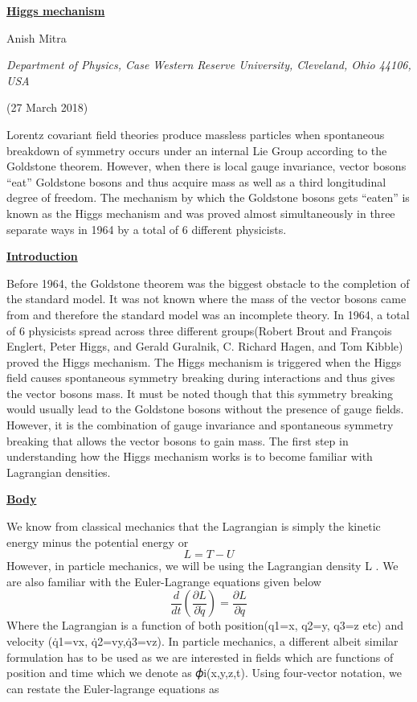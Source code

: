 \documentclass[12pt]{article}
\begin{document}
	\begin{center}
		\textbf{\underline{Higgs mechanism}}
		
		Anish Mitra
		
		\textit{Department of Physics, Case Western Reserve University, Cleveland, Ohio 44106, USA }
		
		(27 March 2018)
		
	\end{center}

\begin{changemargin}{1.5cm}{1.5cm} 	
Lorentz covariant field theories produce massless particles when spontaneous breakdown of symmetry occurs under an internal Lie Group according to the Goldstone theorem. However, when there is local gauge invariance, vector bosons “eat” Goldstone bosons and thus acquire mass as well as a third longitudinal degree of freedom. The mechanism by which the Goldstone bosons gets “eaten” is known as the Higgs mechanism and was proved almost simultaneously in three separate ways in 1964 by a total of 6 different physicists.
\end{changemargin}
\begin{flushleft}
\textbf{\underline{Introduction}}
\end{flushleft}
Before 1964, the Goldstone theorem was the biggest obstacle to the completion of the standard model. It was not known where the mass of the vector bosons came from and therefore the standard model was an incomplete theory. In 1964, a total of 6 physicists spread across three different groups(Robert Brout and François Englert, Peter Higgs, and Gerald Guralnik, C. Richard Hagen, and Tom Kibble) proved the Higgs mechanism. The Higgs mechanism is triggered when the Higgs field causes spontaneous symmetry breaking during interactions and thus gives the vector bosons mass. It  must be noted though that this symmetry breaking would usually lead to the Goldstone bosons without the presence of gauge fields. However, it is the combination of gauge invariance and spontaneous symmetry breaking that allows the vector bosons to gain mass.
The first step in understanding how the Higgs mechanism works is to become familiar with Lagrangian densities. 
\begin{flushleft}	
\textbf{\underline{Body}}
\end{flushleft}
We know from classical mechanics that the Lagrangian is simply the kinetic energy minus the potential energy or 
\begin{equation}
L = T-U
\end{equation}
However, in particle mechanics, we will be using the Lagrangian density L . We are also familiar with the Euler-Lagrange equations given below 
\begin{equation}
\frac{d}{dt}(\frac{\partial{L}}{\partial{\dot{q}}}) = \frac{\partial{L}}{\partial{q}}
\end{equation}
Where the Lagrangian is a function of both position(q1=x, q2=y, q3=z etc) and velocity (q̇1=vx, q̇2=vy,q̇3=vz). In particle mechanics, a different albeit similar formulation has to be used as we are interested in fields which are functions of position and time which we denote as 𝜙i(x,y,z,t). Using four-vector notation, we can restate the Euler-lagrange equations as 
\end{document}
